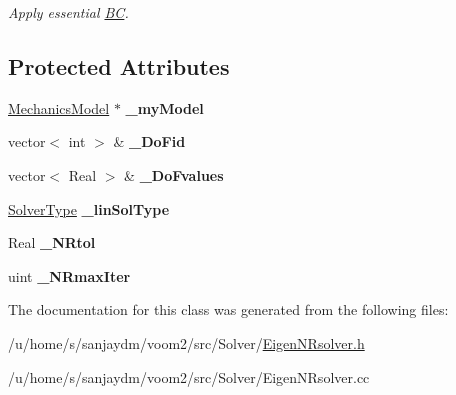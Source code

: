 \begin{DoxyCompactItemize}
\begin{DoxyCompactList}\small\item\em Apply essential \hyperlink{struct_b_c}{BC}. \item\end{DoxyCompactList}\end{DoxyCompactItemize}
\subsection*{Protected Attributes}
\begin{DoxyCompactItemize}
\item 
\hypertarget{classvoom_1_1_eigen_n_rsolver_a091b81cda6ae358080a26fa1397bb2d0}{
\hyperlink{classvoom_1_1_mechanics_model}{MechanicsModel} $\ast$ {\bfseries \_\-myModel}}
\label{classvoom_1_1_eigen_n_rsolver_a091b81cda6ae358080a26fa1397bb2d0}

\item 
\hypertarget{classvoom_1_1_eigen_n_rsolver_a158262012a884e89d858685d5f530a83}{
vector$<$ int $>$ \& {\bfseries \_\-DoFid}}
\label{classvoom_1_1_eigen_n_rsolver_a158262012a884e89d858685d5f530a83}

\item 
\hypertarget{classvoom_1_1_eigen_n_rsolver_a25b06a7cf90c5bafcebed451ab988644}{
vector$<$ Real $>$ \& {\bfseries \_\-DoFvalues}}
\label{classvoom_1_1_eigen_n_rsolver_a25b06a7cf90c5bafcebed451ab988644}

\item 
\hypertarget{classvoom_1_1_eigen_n_rsolver_ab432ebb6442be51a4c032c9fe0e8783a}{
\hyperlink{namespacevoom_a2874640a1124292b983171d745088fef}{SolverType} {\bfseries \_\-linSolType}}
\label{classvoom_1_1_eigen_n_rsolver_ab432ebb6442be51a4c032c9fe0e8783a}

\item 
\hypertarget{classvoom_1_1_eigen_n_rsolver_a9414256a12b5b5a83b2f349f8244dfcc}{
Real {\bfseries \_\-NRtol}}
\label{classvoom_1_1_eigen_n_rsolver_a9414256a12b5b5a83b2f349f8244dfcc}

\item 
\hypertarget{classvoom_1_1_eigen_n_rsolver_af225056a77b047d00460d39752b91786}{
uint {\bfseries \_\-NRmaxIter}}
\label{classvoom_1_1_eigen_n_rsolver_af225056a77b047d00460d39752b91786}

\end{DoxyCompactItemize}


The documentation for this class was generated from the following files:\begin{DoxyCompactItemize}
\item 
/u/home/s/sanjaydm/voom2/src/Solver/\hyperlink{_eigen_n_rsolver_8h}{EigenNRsolver.h}\item 
/u/home/s/sanjaydm/voom2/src/Solver/EigenNRsolver.cc\end{DoxyCompactItemize}
